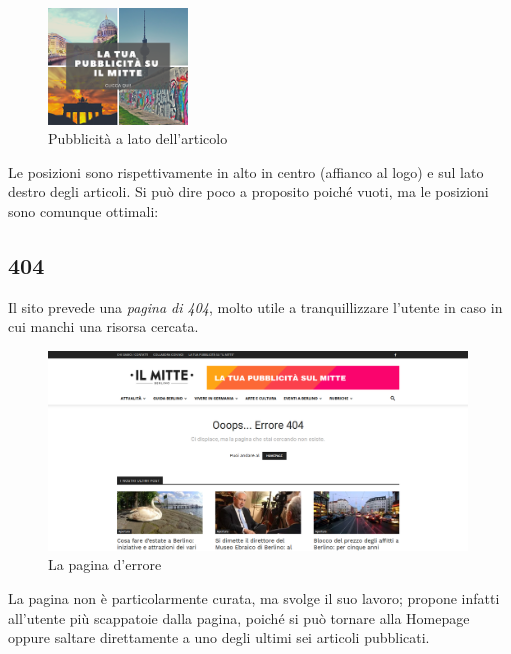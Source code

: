 \begin{figure}[htbp]
\begin{center}
\includegraphics[width=10em]{img/pubblicita2}
\caption{Pubblicità a lato dell'articolo}
\end{center}
\end{figure}
\vspace{30pt}

Le posizioni sono rispettivamente in alto in centro (affianco al logo) e sul lato destro degli articoli. Si può dire poco a proposito poiché vuoti, ma le posizioni sono comunque ottimali: %

\subsection{404}
Il sito prevede una \textit{pagina di 404}, molto utile a tranquillizzare l'utente in caso in cui manchi una risorsa cercata.

\vspace{30pt}
\begin{figure}[htbp]
\begin{center}
\includegraphics[width=30em]{img/404}
\caption{La pagina d'errore}
\end{center}
\end{figure}
\vspace{30pt}

La pagina non è particolarmente curata, ma svolge il suo lavoro; propone infatti all'utente più scappatoie dalla pagina, poiché si può tornare alla Homepage oppure saltare direttamente a uno degli ultimi sei articoli pubblicati.